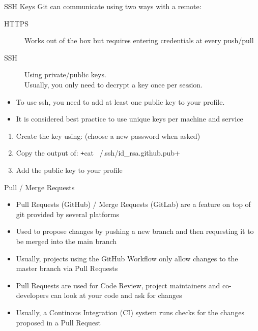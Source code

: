 \begin{frame}[fragile]{SSH Keys}
  Git can communicate using two ways with a remote:
  \begin{description}
    \item[HTTPS] Works out of the box but requires entering credentials at every push/pull
    \item[SSH] Using private/public keys. \\ Usually, you only need to decrypt a key once per session.
  \end{description}

  \begin{itemize}
    \item To use ssh, you need to add at least one public key to your profile. 
    \item It is considered best practice to use unique keys per machine and service
  \end{itemize}
  
  \begin{enumerate}
    \item Create the key using: (choose a new password when asked)
    \item Copy the output of: \texttt+cat ~/.ssh/id_rsa.github.pub+
    \item Add the public key to your profile 
  \end{enumerate}
\end{frame}

\begin{frame}[c]{Pull / Merge Requests}
  \begin{itemize}
    \item Pull Requests (GitHub) / Merge Requests (GitLab) are a feature on top of git provided by several platforms
    \item Used to propose changes by pushing a new branch and then requesting it to be merged into the main branch
    \item Usually, projects using the GitHub Workflow only allow changes to the master branch via Pull Requests
    \item Pull Requests are used for Code Review, project maintainers and co-developers can look at your code and
      ask for changes
    \item Usually, a Continous Integration (CI) system runs checks for the changes proposed in a Pull Request
  \end{itemize}
\end{frame}

